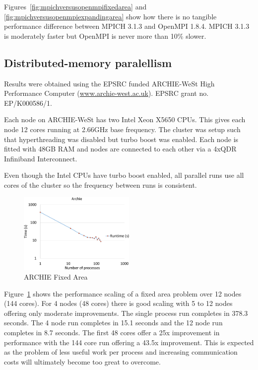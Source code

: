 Figures~\ref{fig:mpichversusopenmpifixedarea} and
\ref{fig:mpichversusopenmpiexpandingarea} show how there is no tangible
performance difference between MPICH 3.1.3 and OpenMPI 1.8.4. MPICH 3.1.3 is
moderately faster but OpenMPI is never more than 10\% slower.

\subsection{Distributed-memory paralellism}

Results were obtained using the EPSRC funded ARCHIE-WeSt High Performance
Computer (\url{www.archie-west.ac.uk}). EPSRC grant no. EP/K000586/1.

Each node on ARCHIE-WeSt has two Intel Xeon X5650 CPUs. This gives each node 12
cores running at 2.66GHz base frequency. The cluster was setup such that
hyperthreading was disabled but turbo boost was enabled. Each node is fitted
with 48GB RAM and nodes are connected to each other via a 4xQDR Infiniband
Interconnect.

Even though the Intel CPUs have turbo boost enabled, all parallel runs use all
cores of the cluster so the frequency between runs is consistent.

\begin{figure}
    \includegraphics[page=1,width=0.5\textwidth]
    {graphs/ARCHIE-OpenMPI162-GFORTRAN482-default-mapping-fixed-area-crop.pdf}
    \caption{ARCHIE Fixed Area}
    \label{fig:archiefixedarea}
\end{figure}

Figure~\ref{fig:archiefixedarea} shows the performance scaling of a fixed area
problem over 12 nodes (144 cores). For 4 nodes (48 cores) there is good scaling
with 5 to 12 nodes offering only moderate improvements. The single process run
completes in 378.3 seconds. The 4 node run completes in 15.1 seconds and the 12
node run completes in 8.7 seconds. The first 48 cores offer a 25x improvement in
performance with the 144 core run offering a 43.5x improvement. This is expected
as the problem of less useful work per process and increasing communication
costs will ultimately become too great to overcome.

